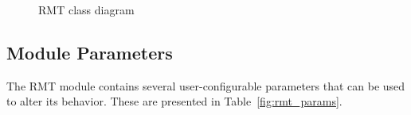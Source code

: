             \begin{figure}[H]
                \begin{center}
                  \caption{RMT class diagram}
                  \label{fig:rinasim:rmt-erd}
                \end{center}
            \end{figure}

        \subsection{Module Parameters}
            The RMT module contains several user-configurable parameters that can be used to alter its behavior. These are presented in Table~\ref{fig:rmt_params}.

